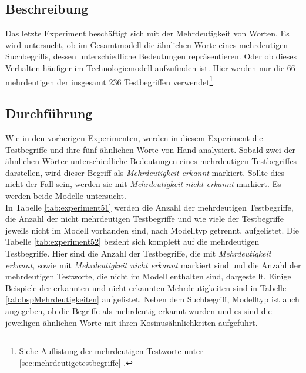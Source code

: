 \documentclass[12pt,a4paper]{report}
\begin{document}
\label{chap:Experiment5}
		\subsection*{Beschreibung}
		Das letzte Experiment beschäftigt sich mit der Mehrdeutigkeit von Worten. Es wird untersucht, ob im Gesamtmodell die ähnlichen Worte eines mehrdeutigen Suchbegriffs, dessen unterschiedliche Bedeutungen repräsentieren. Oder ob dieses Verhalten häufiger im Technologiemodell aufzufinden ist.
		Hier werden nur die 66 mehrdeutigen der insgesamt 236 Testbegriffen verwendet\footnote{Siehe Auflistung der mehrdeutigen Testworte unter \ref{sec:mehrdeutigetestbegriffe} .}. \\
		
		
		\subsection*{Durchführung}
Wie in den vorherigen Experimenten, werden in diesem Experiment die Testbegriffe und ihre fünf ähnlichen Worte von Hand analysiert. Sobald zwei der ähnlichen Wörter unterschiedliche Bedeutungen eines mehrdeutigen Testbegriffes darstellen, wird dieser Begriff als \textit{Mehrdeutigkeit erkannt} markiert. Sollte dies nicht der Fall sein, werden sie mit \textit{Mehrdeutigkeit nicht erkannt} markiert. Es werden beide Modelle untersucht.\\
In Tabelle \ref{tab:experiment51} werden die Anzahl der mehrdeutigen Testbegriffe, die Anzahl der nicht mehrdeutigen Testbegriffe und wie viele der Testbegriffe jeweils nicht im Modell vorhanden sind, nach Modelltyp getrennt, aufgelistet. Die Tabelle \ref{tab:experiment52} bezieht sich komplett auf die mehrdeutigen Testbegriffe. Hier sind die Anzahl der Testbegriffe, die mit \textit{Mehrdeutigkeit erkannt}, sowie mit \textit{Mehrdeutigkeit nicht erkannt} markiert sind und die Anzahl der mehrdeutigen Testworte, die nicht im Modell enthalten sind, dargestellt. Einige Beispiele der erkannten und nicht erkannten Mehrdeutigkeiten sind in Tabelle \ref{tab:bspMehrdeutigkeiten} aufgelistet. Neben dem Suchbegriff, Modelltyp ist auch angegeben, ob die Begriffe als mehrdeutig erkannt wurden und es sind die jeweiligen ähnlichen Worte mit ihren Kosinusähnlichkeiten aufgeführt. \\
\end{document}
